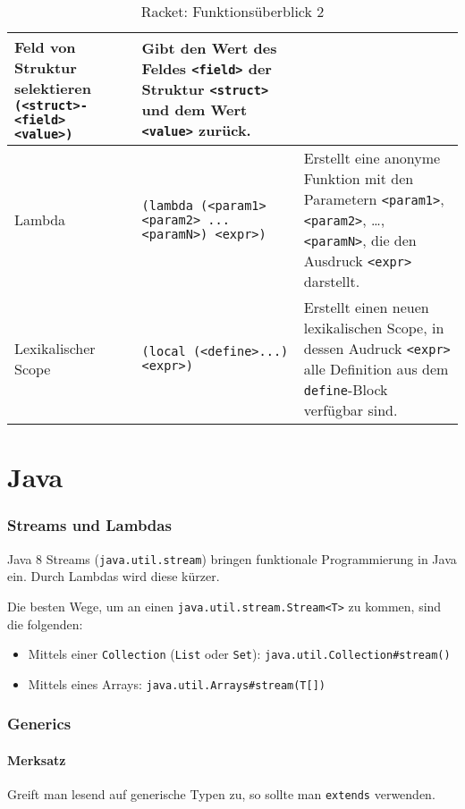 \begin{sidewaystable}
\begin{tabular}{p{5cm} | p{7cm} | p{9cm}}
                \hline
                Feld von Struktur selektieren \texttt{(<struct>-<field> <value>)} & Gibt den Wert des Feldes \texttt{<field>} der Struktur \texttt{<struct>} und dem Wert \texttt{<value>} zurück. \\
                \hline
                Lambda & \texttt{(lambda (<param1> <param2> ... <paramN>) <expr>)} & Erstellt eine anonyme Funktion mit den Parametern \texttt{<param1>}, \texttt{<param2>}, \dots, \texttt{<paramN>}, die den Ausdruck \texttt{<expr>} darstellt. \\
                Lexikalischer Scope & \texttt{(local (<define>...) <expr>)} & Erstellt einen neuen lexikalischen Scope, in dessen Audruck \texttt{<expr>} alle Definition aus dem \texttt{define}-Block verfügbar sind. \\
            \end{tabular}
            \caption{Racket: Funktionsüberblick 2}
        \end{sidewaystable}




\chapter{Java}
    \subsection{Streams und Lambdas}
        Java 8 Streams (\texttt{java.util.stream}) bringen funktionale Programmierung in Java ein. Durch Lambdas wird diese kürzer.

        Die besten Wege, um an einen \texttt{java.util.stream.Stream<T>} zu kommen, sind die folgenden:
        \begin{itemize}
            \item Mittels einer \texttt{Collection} (\texttt{List} oder \texttt{Set}): \texttt{java.util.Collection\#stream()}
            \item Mittels eines Arrays: \texttt{java.util.Arrays\#stream(T[])}
        \end{itemize}



    \subsection{Generics}
        \subsubsection{Merksatz}
            Greift man lesend auf generische Typen zu, so sollte man \texttt{extends} verwenden.

